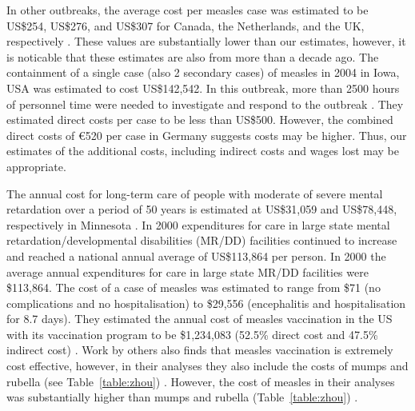 \documentclass{article}
\begin{document}
In other outbreaks, the average cost per measles case was estimated to be US\$254, US\$276, and US\$307 for Canada, the Netherlands, and the UK, respectively  \citep{carabin2}. These values are substantially lower than our estimates, however, it is noticable that these estimates are also from more than a decade ago. The containment of a single case (also 2 secondary cases) of measles in 2004 in Iowa, USA was estimated to cost US\$142,542. In this outbreak, more than 2500 hours of personnel time were needed to investigate and respond to the outbreak \citep{dayan5}. They estimated direct costs per case to be less than US\$500. However, the combined direct costs of \euro 520 per case in Germany \citep{siedler6} suggests costs may be higher. Thus, our estimates of the additional costs, including indirect costs and wages lost may be appropriate.

The annual cost for long-term care of people with moderate of severe mental retardation over a period of 50 years is estimated at US\$31,059 and US\$78,448, respectively in Minnesota \citep{prouty1}. In 2000 expenditures for care in large state mental retardation/developmental disabilities (MR/DD) facilities continued to increase and reached a national annual average of US\$113,864 per person. In 2000 the average annual expenditures for care in large state MR/DD facilities were \$113,864. The cost of a case of measles was estimated to range from \$71 (no complications and no hospitalisation) to \$29,556 (encephalitis and hospitalisation for 8.7 days). They estimated the annual cost of measles vaccination in the US with its vaccination program to be \$1,234,083 (52.5\% direct cost and 47.5\% indirect cost) \citep{zhou4}. Work by others also finds that measles vaccination is extremely cost effective, however, in their analyses they also include the costs of mumps and rubella (see Table~\autoref{table:zhou}) \citep{zhou4}. However, the cost of measles in their analyses was substantially higher than mumps and rubella (Table~\autoref{table:zhou}) \citep{zhou4}.
\end{document}
